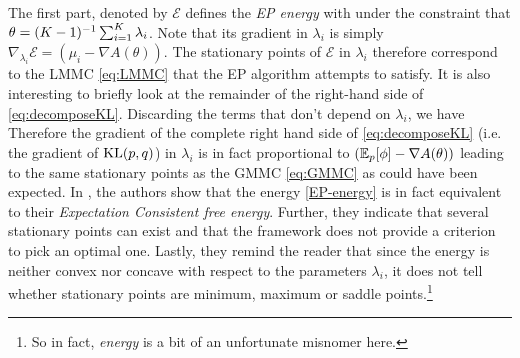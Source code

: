 %
%
The first part, denoted by $\mathcal E$ defines the \emph{EP energy} with
%
%
under the constraint that $\theta=(K-1)^{-1} \sum_{i=1}^{K}\lambda_i$. Note that its gradient in $\lambda_i$ is simply $\nabla_{\lambda_i}\mathcal E = (\mu_i-\nabla A(\theta))$. 
The stationary points of $\mathcal E$ in $\lambda_i$ therefore correspond to the LMMC \eqref{eq:LMMC} that the EP algorithm attempts to satisfy.
It is also interesting to briefly look at the remainder of the right-hand side of \eqref{eq:decomposeKL}. Discarding the terms that don't depend on $\lambda_i$, we have
%
%
Therefore the gradient of the complete right hand side of \eqref{eq:decomposeKL} (i.e. the gradient of $\mathrm{KL}\!\left(p,q\right)$) in $\lambda_i$ is in fact proportional to $(\mathbb E_{p}[\phi]-\nabla A(\theta))$ leading to the same stationary points as the GMMC \eqref{eq:GMMC} as could have been expected.
%
In \citet{heskes05}, the authors show that the energy \eqref{EP-energy} is in fact equivalent to their \emph{Expectation Consistent free energy}. Further, they indicate that several stationary points can exist and that the framework does not provide a criterion to pick an optimal one. Lastly, they remind the reader that since the energy is neither convex nor concave with respect to the parameters $\lambda_i$, it does not tell whether stationary points are minimum, maximum or saddle points.\footnote{So in fact, \emph{energy} is a bit of an unfortunate misnomer here.} %
%
